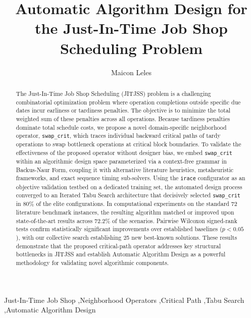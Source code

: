 \documentclass[preprint,12pt,authoryear]{elsarticle}
\begin{document}
\begin{frontmatter}

\title{Automatic Algorithm Design for the Just-In-Time Job Shop Scheduling Problem}

\author{Maicon Leles}
\author{}
\author{}


\begin{abstract}
The Just-In-Time Job Shop Scheduling (JITJSS) problem is a challenging combinatorial optimization problem where operation completions outside specific due dates incur earliness or tardiness penalties.
The objective is to minimize the total weighted sum of these penalties across all operations.
Because tardiness penalties dominate total schedule costs, we propose a novel domain-specific neighborhood operator, \texttt{swap\_crit}, which traces individual backward critical paths of tardy operations to swap bottleneck operations at critical block boundaries.
To validate the effectiveness of the proposed operator without designer bias, we embed \texttt{swap\_crit} within an algorithmic design space parameterized via a context-free grammar in Backus-Naur Form, coupling it with alternative literature heuristics, metaheuristic frameworks, and exact sequence timing sub-solvers.
Using the \texttt{irace} configurator as an objective validation testbed on a dedicated training set, the automated design process converged to an Iterated Tabu Search architecture that decisively selected \texttt{swap\_crit} in 80\% of the elite configurations.
In computational experiments on the standard 72 literature benchmark instances, the resulting algorithm matched or improved upon state-of-the-art results across 72.2\% of the scenarios.
Pairwise Wilcoxon signed-rank tests confirm statistically significant improvements over established baselines ($p < 0.05$), with our collective search establishing 25 new best-known solutions.
These results demonstrate that the proposed critical-path operator addresses key structural bottlenecks in JITJSS and establish Automatic Algorithm Design as a powerful methodology for validating novel algorithmic components.
\end{abstract}

\begin{keyword}
Just-In-Time Job Shop \sep Neighborhood Operators \sep Critical Path \sep Tabu Search \sep Automatic Algorithm Design
\end{keyword}

\end{frontmatter}
\end{document}
